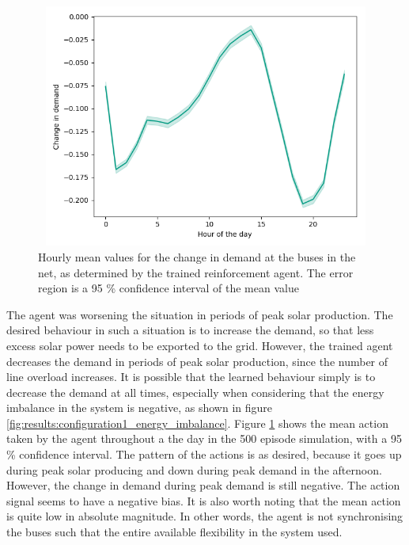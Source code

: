 \documentclass[class=book, crop=false, 11pt]{standalone}
\begin{document}
\begin{figure}[h]
    \center
\includegraphics[height=8cm, width=12cm]{figures/config1_action_hour.png}
    \caption[size = 9]{Hourly mean values for the change in demand at the buses in the net, as determined by the trained reinforcement agent. The error region is a 95 \% confidence interval of the mean value}
    \label{fig:discussion:config1_action_hour}
\end{figure}

The agent was worsening the situation in periods of peak solar production. The desired behaviour in such a situation is to increase the demand, so that less excess solar power needs to be exported to the grid. However, the trained agent decreases the demand in periods of peak solar production, since the number of line overload increases. It is possible that the learned behaviour simply is to decrease the demand at all times, especially when considering that the energy imbalance in the system is negative, as shown in figure \ref{fig:results:configuration1_energy_imbalance}. Figure \ref{fig:discussion:config1_action_hour} shows the mean action taken by the agent throughout a the day in the 500 episode simulation, with a 95 \% confidence interval. The pattern of the actions is as desired, because it goes up during peak solar producing and down during peak demand in the afternoon. However, the change in demand during peak demand is still negative. The action signal seems to have a negative bias. It is also worth noting that the mean action is quite low in absolute magnitude. In other words, the agent is not synchronising the buses such that the entire available flexibility in the system used.
\end{document}

